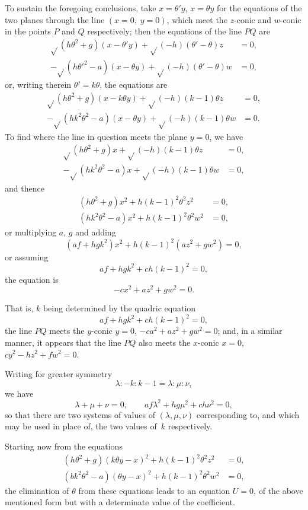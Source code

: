 \documentclass[11pt,a4paper]{book}
\begin{document}
To sustain the foregoing conclusions, take $x = \theta'y$, $x = \theta y$ for the equations of the two planes through the line $(x=0,\; y=0)$, which meet the $z$-conic and $w$-conic in the points $P$ and $Q$ respectively; then the equations of the line $PQ$ are
\begin{align*}
\sqrt{}(h\theta^{2} + g)(x - \theta'y) + \sqrt{}(-h)(\theta' - \theta)z &= 0, \\
-\sqrt{}(h\theta'^{2} - a)(x - \theta y) + \sqrt{}(-h)(\theta' - \theta)w &= 0,
\end{align*}
or, writing therein $\theta' = k\theta$, the equations are
\begin{align*}
\sqrt{}(h\theta^{2} + g)(x - k\theta y) + \sqrt{}(-h)(k - 1)\theta z &= 0, \\
-\sqrt{}(hk^{2}\theta^{2} - a)(x - \theta y) + \sqrt{}(-h)(k - 1)\theta w &= 0.
\end{align*}
To find where the line in question meets the plane $y = 0$, we have
\begin{align*}
\sqrt{}(h\theta^{2} + g)x + \sqrt{}(-h)(k - 1)\theta z &= 0, \\
-\sqrt{}(hk^{2}\theta^{2} - a)x + \sqrt{}(-h)(k - 1)\theta w &= 0,
\end{align*}
and thence
\begin{align*}
(h\theta^{2} + g)x^{2} + h(k-1)^{2}\theta^{2}z^{2} &= 0, \\
(hk^{2}\theta^{2} - a)x^{2} + h(k-1)^{2}\theta^{2}w^{2} &= 0,
\end{align*}
or multiplying $a$, $g$ and adding
\[
(af + hgk^{2})x^{2} + h(k-1)^{2}(az^{2} + gw^{2}) = 0,
\]
or assuming
\[
af + hgk^{2} + ch(k-1)^{2} = 0,
\]
the equation is
\[
-cx^{2} + az^{2} + gw^{2} = 0.
\]

\newpage
\setcounter{page}{105}

That is, $k$ being determined by the quadric equation
\[
af + hgk^{2} + ch(k-1)^{2} = 0,
\]
the line $PQ$ meets the $y$-conic $y=0$, $-ca^{2} + az^{2} + gw^{2} = 0$; and, in a similar manner, it appears that the line $PQ$ also meets the $x$-conic $x=0$, $cy^{2} - hz^{2} + fw^{2} = 0$.

Writing for greater symmetry
\[
\lambda : -k : k-1 = \lambda : \mu : \nu,
\]
we have
\[
\lambda + \mu + \nu = 0, \qquad af\lambda^{2} + hg\mu^{2} + ch\nu^{2} = 0,
\]
so that there are two systems of values of $(\lambda, \mu, \nu)$ corresponding to, and which may be used in place of, the two values of~$k$ respectively.

Starting now from the equations
\begin{align*}
(h\theta^{2} + g)(k\theta y - x)^{2} + h(k-1)^{2}\theta^{2}z^{2} &= 0, \\
(bk^{2}\theta^{2} - a)(\theta y - x)^{2} + h(k-1)^{2}\theta^{2}w^{2} &= 0,
\end{align*}
the elimination of $\theta$ from these equations leads to an equation $U=0$, of the above mentioned form but with a determinate value of the coefficient.
\end{document}
